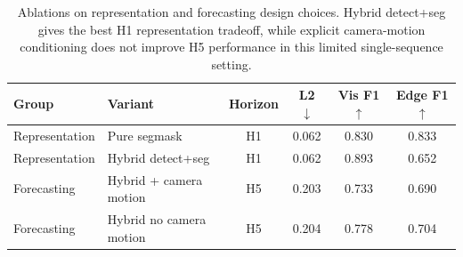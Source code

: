 \begin{table}[t]
\centering
\caption{Ablations on representation and forecasting design choices. Hybrid detect+seg gives the best H1 representation tradeoff, while explicit camera-motion conditioning does not improve H5 performance in this limited single-sequence setting.}
\small
\begin{tabular}{llcccc}
\toprule
Group & Variant & Horizon & L2 $\downarrow$ & Vis F1 $\uparrow$ & Edge F1 $\uparrow$ \\
\midrule
Representation & Pure segmask & H1 & 0.062 & 0.830 & 0.833 \\
Representation & Hybrid detect+seg & H1 & 0.062 & 0.893 & 0.652 \\
Forecasting & Hybrid + camera motion & H5 & 0.203 & 0.733 & 0.690 \\
Forecasting & Hybrid no camera motion & H5 & 0.204 & 0.778 & 0.704 \\
\bottomrule
\end{tabular}
\end{table}